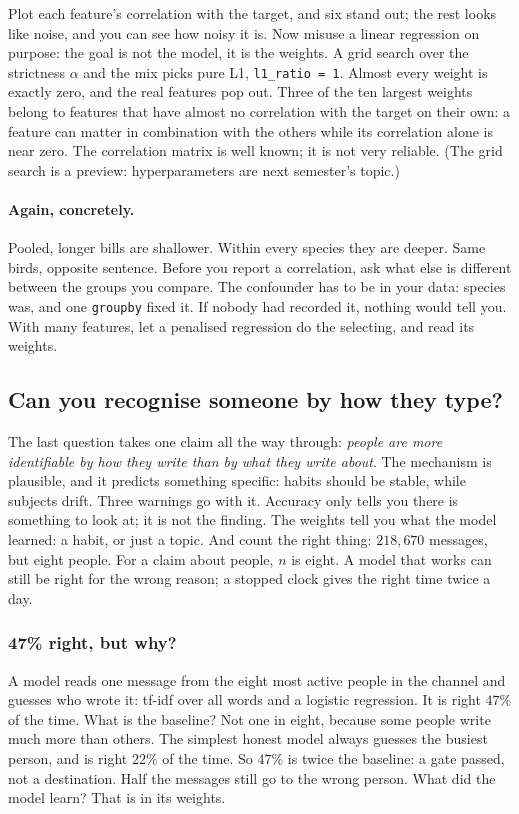 \documentclass[12pt, a4paper]{article}
\theoremstyle{definition}
\theoremstyle{remark}
\newcommand{\againconcretely}{\paragraph{Again, concretely.}}
\begin{document}
Plot each feature's correlation with the target, and six stand out; the rest looks like noise, and you can see how noisy it is. Now misuse a linear regression on purpose: the goal is not the model, it is the weights. A grid search over the strictness $\alpha$ and the mix picks pure L1, \texttt{l1\_ratio = 1}. Almost every weight is exactly zero, and the real features pop out. Three of the ten largest weights belong to features that have almost no correlation with the target on their own: a feature can matter in combination with the others while its correlation alone is near zero. The correlation matrix is well known; it is not very reliable. (The grid search is a preview: hyperparameters are next semester's topic.)

\againconcretely
Pooled, longer bills are shallower. Within every species they are deeper. Same birds, opposite sentence. Before you report a correlation, ask what else is different between the groups you compare. The confounder has to be in your data: species was, and one \texttt{groupby} fixed it. If nobody had recorded it, nothing would tell you. With many features, let a penalised regression do the selecting, and read its weights.

\subsection{Can you recognise someone by how they type?}
\label{sec:typing}
The last question takes one claim all the way through: \emph{people are more identifiable by how they write than by what they write about}. The mechanism is plausible, and it predicts something specific: habits should be stable, while subjects drift. Three warnings go with it. Accuracy only tells you there is something to look at; it is not the finding. The weights tell you what the model learned: a habit, or just a topic. And count the right thing: $218{,}670$ messages, but eight people. For a claim about people, $n$ is eight. A model that works can still be right for the wrong reason; a stopped clock gives the right time twice a day.

\subsubsection{47\% right, but why?}
A model reads one message from the eight most active people in the channel and guesses who wrote it: tf-idf over all words and a logistic regression. It is right $47\%$ of the time. What is the baseline? Not one in eight, because some people write much more than others. The simplest honest model always guesses the busiest person, and is right $22\%$ of the time. So $47\%$ is twice the baseline: a gate passed, not a destination. Half the messages still go to the wrong person. What did the model learn? That is in its weights.
\end{document}
